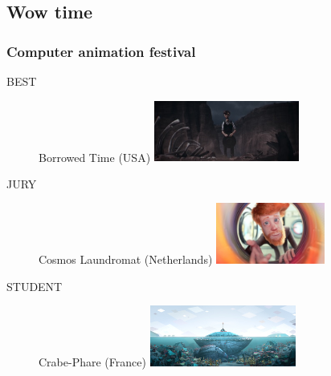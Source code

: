 \subsection{Wow time}
\frame
{
	\frametitle{Computer animation festival}
				\begin{description}
					\item[BEST] Borrowed Time (USA) 
					 \includegraphics[height=2cm]{img/caf1.jpg}
					\item[JURY] Cosmos Laundromat (Netherlands)
						\includegraphics[height=2cm]{img/caf2.jpg}
					\item[STUDENT] Crabe-Phare (France) \includegraphics[height=2cm]{img/caf3.jpeg}
				\end{description}
	
	
}

